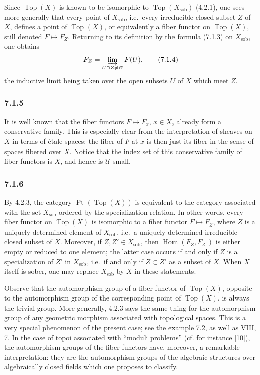 \documentclass[11pt]{article}
\newcommand{\U}{\mathcal{U}}
\newcommand{\Top}{\operatorname{Top}}
\newcommand{\Hom}{\operatorname{Hom}}
\newcommand{\Ppoint}{\operatorname{Pt}}
\newcommand{\sob}{\operatorname{sob}}
\newcommand{\ie}{i.e.}
\begin{document}
Since \(\Top(X)\) is known to be isomorphic to \(\Top(X_{\sob})\) (4.2.1), one sees more generally that every point of \(X_{\sob}\), \ie\ every irreducible closed subset \(Z\) of \(X\), defines a point of \(\Top(X)\), or equivalently a fiber functor on \(\Top(X)\), still denoted \(F\mapsto F_Z\). Returning to its definition by the formula (7.1.3) on \(X_{\sob}\), one obtains
\begin{equation*}
F_Z=\varinjlim_{U\cap Z\ne\varnothing}F(U),\tag{7.1.4}
\end{equation*}
the inductive limit being taken over the open subsets \(U\) of \(X\) which meet \(Z\).

\subsubsection*{7.1.5}
It is well known that the fiber functors \(F\mapsto F_x\), \(x\in X\), already form a conservative family. This is especially clear from the interpretation of sheaves on \(X\) in terms of \'{e}tale spaces: the fiber of \(F\) at \(x\) is then just its fiber in the sense of spaces fibered over \(X\). Notice that the index set of this conservative family of fiber functors is \(X\), and hence is \(\U\)-small.

\subsubsection*{7.1.6}
By 4.2.3, the category \(\Ppoint(\Top(X))\) is equivalent to the category associated with the set \(X_{\sob}\) ordered by the specialization relation. In other words, every fiber functor on \(\Top(X)\) is isomorphic to a fiber functor \(F\mapsto F_Z\), where \(Z\) is a uniquely determined element of \(X_{\sob}\), \ie\ a uniquely determined irreducible closed subset of \(X\). Moreover, if \(Z,Z'\in X_{\sob}\), then \(\Hom(F_Z,F_{Z'})\) is either empty or reduced to one element; the latter case occurs if and only if \(Z\) is a specialization of \(Z'\) in \(X_{\sob}\), \ie\ if and only if \(Z\subset Z'\) as a subset of \(X\). When \(X\) itself is sober, one may replace \(X_{\sob}\) by \(X\) in these statements.

Observe that the automorphism group of a fiber functor of \(\Top(X)\), opposite to the automorphism group of the corresponding point of \(\Top(X)\), is always the trivial group. More generally, 4.2.3 says the same thing for the automorphism group of any geometric morphism associated with topological spaces. This is a very special phenomenon of the present case; see the example 7.2, as well as VIII, 7. In the case of topoi associated with ``moduli problems'' (cf. for instance [10]), the automorphism groups of the fiber functors have, moreover, a remarkable interpretation: they are the automorphism groups of the algebraic structures over algebraically closed fields which one proposes to classify.
\end{document}
